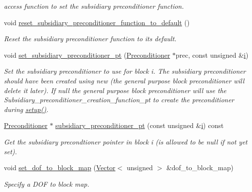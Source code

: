 \begin{DoxyCompactItemize}
\begin{DoxyCompactList}\small\item\em access function to set the subsidiary preconditioner function. \end{DoxyCompactList}\item 
void \hyperlink{classoomph_1_1GeneralPurposeBlockPreconditioner_a83cb56bde98bfaaa887a21dee631a95b}{reset\+\_\+subsidiary\+\_\+preconditioner\+\_\+function\+\_\+to\+\_\+default} ()
\begin{DoxyCompactList}\small\item\em Reset the subsidiary preconditioner function to its default. \end{DoxyCompactList}\item 
void \hyperlink{classoomph_1_1GeneralPurposeBlockPreconditioner_acf2035f5dc4fb56ec593a3e3850689fb}{set\+\_\+subsidiary\+\_\+preconditioner\+\_\+pt} (\hyperlink{classoomph_1_1Preconditioner}{Preconditioner} $\ast$prec, const unsigned \&\hyperlink{cfortran_8h_adb50e893b86b3e55e751a42eab3cba82}{i})
\begin{DoxyCompactList}\small\item\em Set the subsidiary preconditioner to use for block i. The subsidiary preconditioner should have been created using new (the general purpose block preconditioner will delete it later). If null the general purpose block preconditioner will use the Subsidiary\+\_\+preconditioner\+\_\+creation\+\_\+function\+\_\+pt to create the preconditioner during \hyperlink{classoomph_1_1Preconditioner_af4886f4efe510e5c9b0eb19422943588}{setup()}. \end{DoxyCompactList}\item 
\hyperlink{classoomph_1_1Preconditioner}{Preconditioner} $\ast$ \hyperlink{classoomph_1_1GeneralPurposeBlockPreconditioner_a7d61b006b98947379795ae92993e0f72}{subsidiary\+\_\+preconditioner\+\_\+pt} (const unsigned \&\hyperlink{cfortran_8h_adb50e893b86b3e55e751a42eab3cba82}{i}) const
\begin{DoxyCompactList}\small\item\em Get the subsidiary precondtioner pointer in block i (is allowed to be null if not yet set). \end{DoxyCompactList}\item 
void \hyperlink{classoomph_1_1GeneralPurposeBlockPreconditioner_a2cd1e39d9af6275275352a71b4abe977}{set\+\_\+dof\+\_\+to\+\_\+block\+\_\+map} (\hyperlink{classoomph_1_1Vector}{Vector}$<$ unsigned $>$ \&dof\+\_\+to\+\_\+block\+\_\+map)
\begin{DoxyCompactList}\small\item\em Specify a D\+OF to block map. \end{DoxyCompactList}\item 

\end{DoxyCompactItemize}
